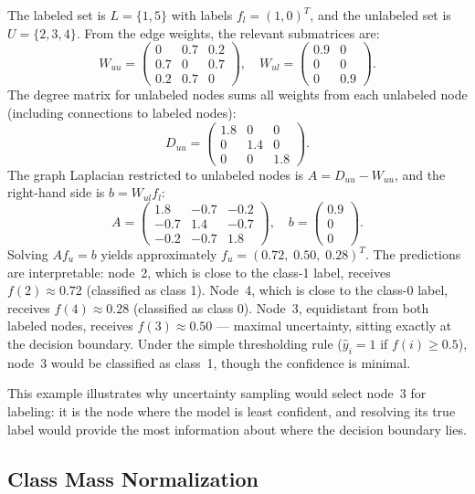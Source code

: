 \documentclass[12pt]{article}
\begin{document}
The labeled set is $L = \{1, 5\}$ with labels $f_l = (1, 0)^T$, and the unlabeled set is $U = \{2, 3, 4\}$. From the edge weights, the relevant submatrices are:
\[
W_{uu} = \begin{pmatrix} 0 & 0.7 & 0.2 \\ 0.7 & 0 & 0.7 \\ 0.2 & 0.7 & 0 \end{pmatrix}, \quad
W_{ul} = \begin{pmatrix} 0.9 & 0 \\ 0 & 0 \\ 0 & 0.9 \end{pmatrix}.
\]
The degree matrix for unlabeled nodes sums all weights from each unlabeled node (including connections to labeled nodes):
\[
D_{uu} = \begin{pmatrix} 1.8 & 0 & 0 \\ 0 & 1.4 & 0 \\ 0 & 0 & 1.8 \end{pmatrix}.
\]
The graph Laplacian restricted to unlabeled nodes is $A = D_{uu} - W_{uu}$, and the right-hand side is $b = W_{ul} f_l$:
\[
A = \begin{pmatrix} 1.8 & -0.7 & -0.2 \\ -0.7 & 1.4 & -0.7 \\ -0.2 & -0.7 & 1.8 \end{pmatrix}, \quad
b = \begin{pmatrix} 0.9 \\ 0 \\ 0 \end{pmatrix}.
\]
Solving $A f_u = b$ yields approximately $f_u = (0.72,\; 0.50,\; 0.28)^T$. The predictions are interpretable: node~2, which is close to the class-1 label, receives $f(2) \approx 0.72$ (classified as class 1). Node~4, which is close to the class-0 label, receives $f(4) \approx 0.28$ (classified as class 0). Node~3, equidistant from both labeled nodes, receives $f(3) \approx 0.50$ --- maximal uncertainty, sitting exactly at the decision boundary. Under the simple thresholding rule ($\hat{y}_i = 1$ if $f(i) \geq 0.5$), node~3 would be classified as class~1, though the confidence is minimal.

This example illustrates why uncertainty sampling would select node~3 for labeling: it is the node where the model is least confident, and resolving its true label would provide the most information about where the decision boundary lies.

\subsection{Class Mass Normalization}
\end{document}
